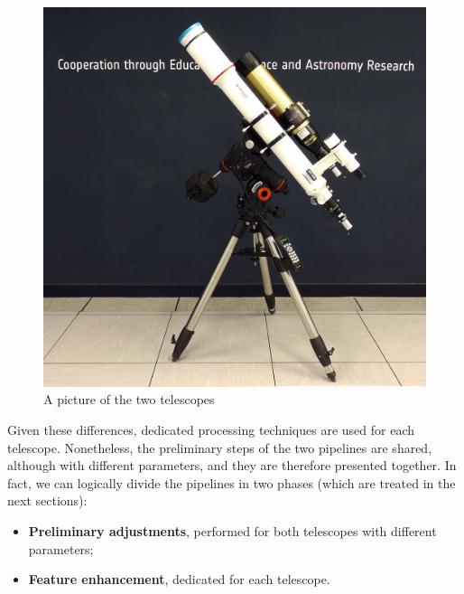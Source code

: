 \begin{figure}[t!]
    \centering
    \captionsetup{justification=centering}
    \includegraphics[height=0.4\textheight]{./pictures/solar-telescopes}
    \caption{A picture of the two telescopes}
    \label{fig:pred-vs-ground}
\end{figure}
Given these differences, dedicated processing techniques are used for each telescope. Nonetheless, the preliminary steps of the two pipelines are shared, although with different parameters, and they are therefore presented together. In fact, we can logically divide the pipelines in two phases (which are treated in the next sections):
\begin{itemize}
  \item \textbf{Preliminary adjustments}, performed for both telescopes with different parameters;
  \item \textbf{Feature enhancement}, dedicated for each telescope.
\end{itemize}

